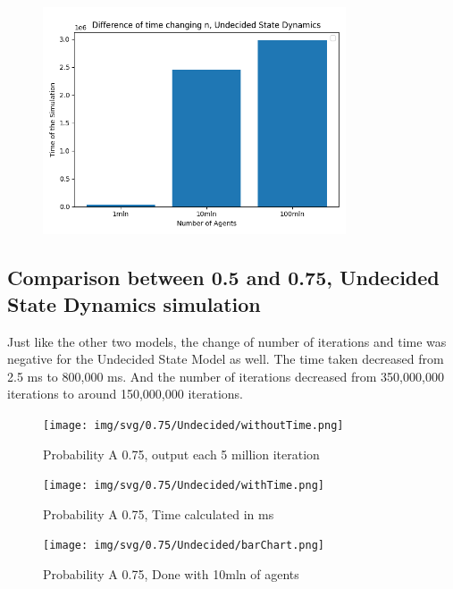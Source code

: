 \begin{figure}[H]
     \centering
     \includegraphics[width=0.80\textwidth,height=0.37\textheight]{img/svg/Undecided/TimeDifferenceN.png}
\end{figure}
\newpage

\subsection[0.5-0.75 Undecided State Dynamics]{Comparison between 0.5 and 0.75, Undecided State Dynamics simulation}

Just like the other two models, the change of number of iterations and time was negative for the Undecided State Model as well. The time taken decreased from 2.5 ms to 800,000 ms. And the number of iterations decreased from 350,000,000 iterations to around 150,000,000 iterations.

\begin{figure}[H]
     \centering
     \texttt{[image: img/svg/0.75/Undecided/withoutTime.png]}
     \caption{Probability A 0.75, output each 5 million iteration}
\end{figure}
\begin{figure}[H]
     \centering
     \texttt{[image: img/svg/0.75/Undecided/withTime.png]}
     \caption{Probability A 0.75, Time calculated in ms}
\end{figure}
\begin{figure}[H]
     \centering
     \texttt{[image: img/svg/0.75/Undecided/barChart.png]}
     \caption{Probability A 0.75, Done with 10mln of agents}
\end{figure}
